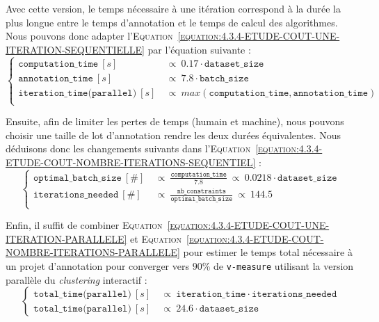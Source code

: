 			Avec cette version, le temps nécessaire à une itération correspond à la durée la plus longue entre le temps d'annotation et le temps de calcul des algorithmes.
			Nous pouvons donc adapter l'\textsc{Equation~\ref{equation:4.3.4-ETUDE-COUT-UNE-ITERATION-SEQUENTIELLE}} par l'équation suivante :
			\begin{equation}
				\label{equation:4.3.4-ETUDE-COUT-UNE-ITERATION-PARALLELE}
				\begin{cases}
					\texttt{computation\_time}~[s]&
						~\propto~0.17 \cdot \texttt{dataset\_size}\\
					\texttt{annotation\_time}~[s]&
						~\propto~7.8 \cdot \texttt{batch\_size} \\
					\texttt{iteration\_time(parallel)}~[s]&
						~\propto~max(\texttt{computation\_time}, \texttt{annotation\_time}) \\
				\end{cases}
			\end{equation}
			
			Ensuite, afin de limiter les pertes de temps (humain et machine), nous pouvons choisir une taille de lot d'annotation rendre les deux durées équivalentes.
			Nous déduisons donc les changements suivants dans l'\textsc{Equation~\ref{equation:4.3.4-ETUDE-COUT-NOMBRE-ITERATIONS-SEQUENTIEL}} :
			\begin{equation}
				\label{equation:4.3.4-ETUDE-COUT-NOMBRE-ITERATIONS-PARALLELE}
				\begin{cases}
					\texttt{optimal\_batch\_size}~[\#]&
						~\propto~\frac{\texttt{computation\_time}}{7.8}
						~\propto~0.0218 \cdot \texttt{dataset\_size} \\
					\texttt{iterations\_needed}~[\#] &
						~\propto~\frac{\texttt{nb\_constraints}}{\texttt{optimal\_batch\_size}}
						~\propto~144.5 \\
				\end{cases}
			\end{equation}
			
			Enfin, il suffit de combiner \textsc{Equation~\ref{equation:4.3.4-ETUDE-COUT-UNE-ITERATION-PARALLELE}} et \textsc{Equation~\ref{equation:4.3.4-ETUDE-COUT-NOMBRE-ITERATIONS-PARALLELE}} pour estimer le temps total nécessaire à un projet d'annotation pour converger vers $90$\% de \texttt{v-measure} utilisant la version parallèle du \textit{clustering} interactif :
			\begin{equation}
				\label{equation:4.3.4-ETUDE-COUT-TOTAL-PARALLELE}
				\begin{cases}
					\texttt{total\_time(parallel)}~[s] &
						~\propto~\texttt{iteration\_time} \cdot \texttt{iterations\_needed} \\
					\texttt{total\_time(parallel)}~[s] &
						~\propto~24.6 \cdot \texttt{dataset\_size}
				\end{cases}
			\end{equation}
			
